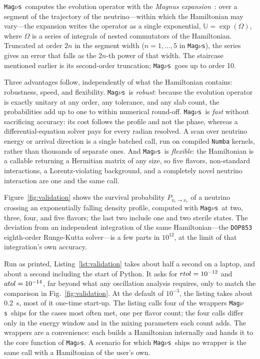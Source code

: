 \documentclass[final,5p,times,twocolumn,sort,compress]{elsarticle}
\makeatletter
\newcommand{\fig}{Fig.}
\DeclareRobustCommand{\_}{%
  \ifmmode\nfss@text{\textunderscore}\else\textunderscore\allowbreak\fi}
\newcommand{\figu}[1]{\fig~\ref{fig:#1}}
\newcommand{\magnus}{{\tt Mag}\ensuremath{\nu}{\tt s}}
\makeatother
\begin{document}
\magnus\ computes the evolution operator with the \textit{Magnus expansion}\ \cite{Magnus:1954zz, Blanes:2008xlr}: over a segment of the trajectory of the neutrino---within which the Hamiltonian may vary---the expansion writes the operator as a single exponential, $\mathbb{U} = \exp(\Omega)$, where $\Omega$ is a series of integrals of nested commutators of the Hamiltonian. Truncated at order $2n$ in the segment width ($n = 1, \dots, 5$ in \magnus), the series gives an error that falls as the $2n$-th power of that width. The staircase mentioned earlier is its second-order truncation; \magnus\ goes up to order 10.

Three advantages follow, independently of what the Hamiltonian contains: robustness, speed, and flexibility. \magnus\ is \emph{robust}: because the evolution operator is exactly unitary at any order, any tolerance, and any slab count, the probabilities add up to one to within numerical round-off. \magnus\ is \emph{fast} without sacrificing accuracy: its cost follows the profile and not the phase, whereas a differential-equation solver pays for every radian resolved. A scan over neutrino energy or arrival direction is a single batched call, run on compiled {\tt Numba} kernels, rather than thousands of separate ones. And \magnus\ is \emph{flexible}: the Hamiltonian is a callable returning a Hermitian matrix of any size, so five flavors, non-standard interactions, a Lorentz-violating background, and a completely novel neutrino interaction are one and the same call. 

Figure~\ref{fig:validation} shows the survival probability $P_{\nu_e \to \nu_e}$ of a neutrino crossing an exponentially falling density profile, computed with \magnus\ at two, three, four, and five flavors; the last two include one and two sterile states. The deviation from an independent integration of the same Hamiltonian---the {\tt DOP853} eighth-order Runge-Kutta solver---is a few parts in $10^{12}$, at the limit of that integration's own accuracy.

Run as printed, Listing~\ref{lst:validation} takes about half a second on a laptop, and about a second including the start of Python. It asks for ${\tt rtol} = 10^{-12}$ and ${\tt atol} = 10^{-14}$, far beyond what any oscillation analysis requires, only to match the comparison in \figu{validation}. At the default of $10^{-3}$, the listing takes about 0.2~s, most of it one-time start-up. The listing calls four of the wrappers \magnus\ ships for the cases most often met, one per flavor count; the four calls differ only in the energy window and in the mixing parameters each count adds. The wrappers are a convenience: each builds a Hamiltonian internally and hands it to the core function of \magnus. A scenario for which \magnus\ ships no wrapper is the same call with a Hamiltonian of the user's own.
\end{document}
